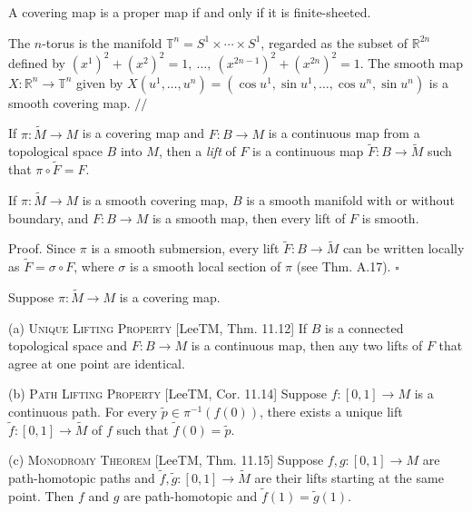 \begin{proposition}
\label{prop:covering-proper-finite-sheeted}
A covering map is a proper map if and only if it is finite-sheeted.
\end{proposition}

\begin{example}
\label{ex:covering-n-torus}
The $n$-torus is the manifold $\mathbb{T}^n = S^1 \times \cdots \times S^1$, regarded as the subset of $\mathbb{R}^{2n}$ defined by $(x^1)^2 + (x^2)^2 = 1,\ \ldots,\ (x^{2n-1})^2 + (x^{2n})^2 = 1$. The smooth map $X: \mathbb{R}^n \to \mathbb{T}^n$ given by $X(u^1, \ldots, u^n) = (\cos u^1, \sin u^1, \ldots, \cos u^n, \sin u^n)$ is a smooth covering map. $\mathbin{//}$
\end{example}

If $\pi: \tilde{M} \to M$ is a covering map and $F: B \to M$ is a continuous map from a topological space $B$ into $M$, then a \emph{lift} of $F$ is a continuous map $\tilde{F}: B \to \tilde{M}$ such that $\pi \circ \tilde{F} = F$.

\begin{proposition}
\label{prop:lifts-smooth-maps-smooth}
If $\pi: \tilde{M} \to M$ is a smooth covering map, $B$ is a smooth manifold with or without boundary, and $F: B \to M$ is a smooth map, then every lift of $F$ is smooth.

Proof. Since $\pi$ is a smooth submersion, every lift $\tilde{F}: B \to \tilde{M}$ can be written locally as $\tilde{F} = \sigma \circ F$, where $\sigma$ is a smooth local section of $\pi$ (see Thm. A.17). $\square$
\end{proposition}

\begin{proposition}
\label{prop:lifting-properties-covering}
\leanok
Suppose $\pi: \tilde{M} \to M$ is a covering map.

(a) \textsc{Unique Lifting Property} [LeeTM, Thm. 11.12] If $B$ is a connected topological space and $F: B \to M$ is a continuous map, then any two lifts of $F$ that agree at one point are identical.

(b) \textsc{Path Lifting Property} [LeeTM, Cor. 11.14] Suppose $f: [0,1] \to M$ is a continuous path. For every $\tilde{p} \in \pi^{-1}(f(0))$, there exists a unique lift $\tilde{f}: [0,1] \to \tilde{M}$ of $f$ such that $\tilde{f}(0) = \tilde{p}$.

(c) \textsc{Monodromy Theorem} [LeeTM, Thm. 11.15] Suppose $f, g: [0,1] \to M$ are path-homotopic paths and $\tilde{f}, \tilde{g}: [0,1] \to \tilde{M}$ are their lifts starting at the same point. Then $f$ and $g$ are path-homotopic and $\tilde{f}(1) = \tilde{g}(1)$.
\end{proposition}

